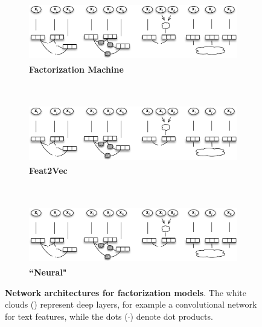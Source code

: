 \documentclass{article}
\begin{document}
\begin{figure}[th]
    \centering
    \begin{subfigure}[t]{0.26\textwidth}
        \centering
        \includegraphics[height=1in]{img/diagram_mf.pdf}
        \caption{\textbf{Factorization Machine}\label{fig:factorization_machine}}
    \end{subfigure}%
    ~
    \begin{subfigure}[t]{0.26\textwidth}
        \centering
        \includegraphics[height=1in]{img/diagram_in.pdf}
        \caption{\textbf{Feat2Vec} \label{fig:feat2vec}}
    \end{subfigure}
    ~
    \begin{subfigure}[t]{0.22\textwidth}
        \centering
        \includegraphics[height=1in]{img/diagram_nmf.pdf}
        \caption{\textbf{``Neural"} \label{fig:neural}}
    \end{subfigure}
    \caption{\textbf{Network architectures for factorization models}.  The  white clouds (\Cloud) represent deep layers, for example a convolutional network for text features, while the dots ($\cdot$) denote dot products.
    \label{fig:architecture}
    }
\end{figure}
\end{document}

